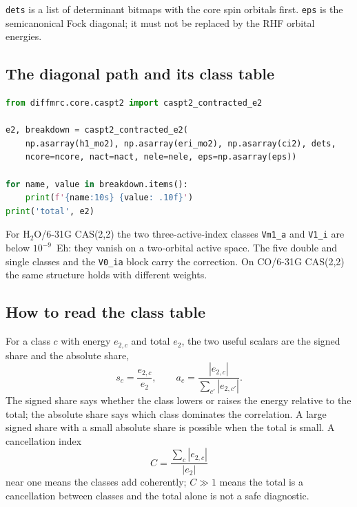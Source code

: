 \texttt{dets} is a list of determinant bitmaps with the core spin
orbitals first.  \texttt{eps} is the semicanonical Fock diagonal; it
must not be replaced by the RHF orbital energies.

\subsection{The diagonal path and its class table}

\begin{lstlisting}[language=Python]
from diffmrc.core.caspt2 import caspt2_contracted_e2

e2, breakdown = caspt2_contracted_e2(
    np.asarray(h1_mo2), np.asarray(eri_mo2), np.asarray(ci2), dets,
    ncore=ncore, nact=nact, nele=nele, eps=np.asarray(eps))

for name, value in breakdown.items():
    print(f'{name:10s} {value: .10f}')
print('total', e2)
\end{lstlisting}

For H$_2$O/6-31G CAS(2,2) the two three-active-index classes
\texttt{Vm1\_a} and \texttt{V1\_i} are below $10^{-9}$~Eh: they vanish
on a two-orbital active space.  The five double and single classes and
the \texttt{V0\_ia} block carry the correction.  On CO/6-31G CAS(2,2)
the same structure holds with different weights.

\subsection{How to read the class table}

For a class $c$ with energy $e_{2,c}$ and total $e_2$, the two useful
scalars are the signed share and the absolute share,
\begin{equation}
  s_c = \frac{e_{2,c}}{e_2},
  \qquad
  a_c = \frac{|e_{2,c}|}{\sum_{c'}|e_{2,c'}|}.
  \label{eq:tutorial-class-shares}
\end{equation}
The signed share says whether the class lowers or raises the energy
relative to the total; the absolute share says which class dominates
the correlation.  A large signed share with a small absolute share is
possible when the total is small.  A cancellation index
\begin{equation}
  C = \frac{\sum_c |e_{2,c}|}{|e_2|}
  \label{eq:tutorial-class-cancellation}
\end{equation}
near one means the classes add coherently; $C\gg1$ means the total is
a cancellation between classes and the total alone is not a safe
diagnostic.

